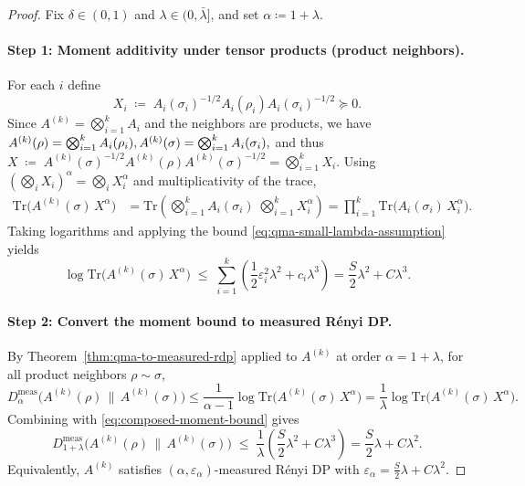 \documentclass[10pt,a4paper]{amsart}
\def\Tr{\mathrm{Tr}}
\begin{document}
\begin{proof}
Fix $\delta\in(0,1)$ and $\lambda\in(0,\bar\lambda]$, and set $\alpha\coloneqq1+\lambda$.

\paragraph{Step 1: Moment additivity under tensor products (product neighbors).}
For each $i$ define
\[
X_i \;\coloneqq\; A_i(\sigma_i)^{-1/2}A_i(\rho_i)A_i(\sigma_i)^{-1/2}\succeq 0.
\]
Since $A^{(k)}= \bigotimes_{i=1}^k A_i$ and the neighbors are products, we have
$
A^{(k)}(\rho)=\bigotimes_{i=1}^k A_i(\rho_i),
\\
A^{(k)}(\sigma)=\bigotimes_{i=1}^k A_i(\sigma_i),
$
and thus
$
X \;\coloneqq\; A^{(k)}(\sigma)^{-1/2}A^{(k)}(\rho)A^{(k)}(\sigma)^{-1/2}
=\bigotimes_{i=1}^k X_i.
$
Using $(\bigotimes_i X_i)^{\alpha}=\bigotimes_i X_i^{\alpha}$ and multiplicativity of the trace,
\begin{align}
\Tr\!\big(A^{(k)}(\sigma)\,X^{\alpha}\big)
&=
\Tr\!\left(\bigotimes_{i=1}^k A_i(\sigma_i)\;\bigotimes_{i=1}^k X_i^{\alpha}\right) =
\prod_{i=1}^k \Tr\!\big(A_i(\sigma_i)\,X_i^{\alpha}\big).
\end{align}
Taking logarithms and applying the bound \eqref{eq:qma-small-lambda-assumption} yields
\begin{equation}
\label{eq:composed-moment-bound}
\log \Tr\!\big(A^{(k)}(\sigma)\,X^{\alpha}\big)
\;\le\;
\sum_{i=1}^k \left(\frac{1}{2}\varepsilon_i^2\lambda^2 + c_i\lambda^3\right)
=
\frac{S}{2}\lambda^2 + C\lambda^3.
\end{equation}

\paragraph{Step 2: Convert the moment bound to measured R\'enyi DP.}
By Theorem~\ref{thm:qma-to-measured-rdp} applied to $A^{(k)}$ at order $\alpha=1+\lambda$,
for all product neighbors $\rho\sim\sigma$,
\[
D^{\mathrm{meas}}_{\alpha}\!\big(A^{(k)}(\rho)\,\|\,A^{(k)}(\sigma)\big)
\le
\frac{1}{\alpha-1}\log \Tr\!\big(A^{(k)}(\sigma)\,X^{\alpha}\big)
=
\frac{1}{\lambda}\log \Tr\!\big(A^{(k)}(\sigma)\,X^{\alpha}\big).
\]
Combining with \eqref{eq:composed-moment-bound} gives
\begin{equation}
\label{eq:measured-rdp-eps}
D^{\mathrm{meas}}_{1+\lambda}\!\big(A^{(k)}(\rho)\,\|\,A^{(k)}(\sigma)\big)
\;\le\;
\frac{1}{\lambda}\left(\frac{S}{2}\lambda^2 + C\lambda^3\right)
=
\frac{S}{2}\lambda + C\lambda^2.
\end{equation}
Equivalently, $A^{(k)}$ satisfies $(\alpha,\varepsilon_\alpha)$-measured R\'enyi DP with
$\varepsilon_\alpha=\frac{S}{2}\lambda + C\lambda^2$.


\end{proof}
\end{document}
